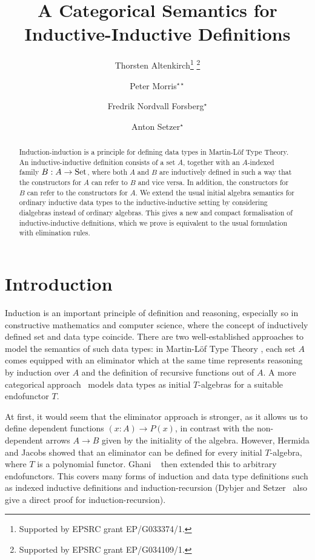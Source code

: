 \documentclass[orivec,envcountsame, ,envcountsect]{llncs}
\title{A Categorical Semantics for Inductive-Inductive Definitions}
\author{Thorsten Altenkirch\inst{1}\thanks{Supported by EPSRC grant EP/G033374/1.}\fnmsep
                                   \thanks{Supported by EPSRC grant EP/G034109/1.}
\and Peter Morris\inst{1}$^{\star\star}$
\and Fredrik Nordvall Forsberg\inst{2}$^{\star}$
\and Anton Setzer\inst{2}$^{\star}$}
\institute{School of Computer Science, University of Nottingham, UK
      \and Department of Computer Science, Swansea University, UK}
\begin{document}
\maketitle

\begin{abstract}
  Induction-induction is a principle for defining data types in
  Martin-L\"of Type Theory. An inductive-inductive definition consists
  of a set $A$, together with an $A$-indexed family $B : A \to \text{Set}$,
  where both $A$ and $B$ are inductively defined in such a way that
  the constructors for $A$ can refer to $B$ and vice versa. In
  addition, the constructors for $B$ can refer to the constructors for
  $A$.
%
  We extend the usual initial algebra semantics for ordinary
  inductive data types to the inductive-inductive setting by
  considering dialgebras instead of ordinary algebras. This gives a
  new and compact formalisation of inductive-inductive definitions,
  which we prove is equivalent to the usual formulation with
  elimination
  rules.
\end{abstract}

\section{Introduction}

Induction is an important principle of definition and reasoning,
especially so in constructive mathematics and computer science, where
the concept of inductively defined set and data type coincide. There
are two well-established approaches to model the semantics of such
data types: in Martin-L\"of Type Theory
\cite{martinlof1984bibliopolis}, each set $A$ comes equipped with an
eliminator which at the same time represents reasoning by induction
over $A$ and the definition of recursive functions out of $A$.  
A more categorical
approach~\cite{goguenThatcherWagnerWright1977initialAlgebra} models
data types as initial $T$-algebras for a suitable endofunctor $T$.

At first, it would seem that the eliminator approach is stronger, as
it allows us to define dependent functions $(x : A) \to P(x)$, in
contrast with the non-dependent arrows $A \to B$ given by the
initiality of the algebra. However, Hermida and Jacobs
\cite{hermidaJacobs1998initInduction} showed that an eliminator can be
defined for every initial $T$-algebra, where $T$ is a polynomial
functor.  Ghani \etal\ \cite{ghaniJohannFumex2010fibind} then extended
this to arbitrary endofunctors.  This covers many forms of induction
and data type definitions such as indexed inductive definitions
\cite{dybjer1994indfam} and induction-recursion
\cite{dybjersetzer1999finax} (Dybjer and
Setzer~\cite{dybjersetzer2003inalg} also give a direct proof for
induction-recursion).
\end{document}
